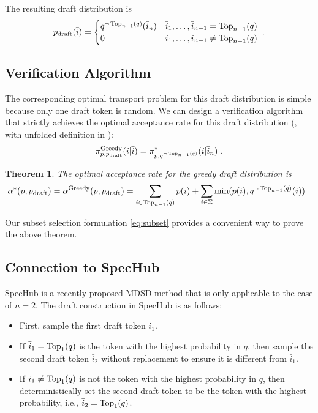 \documentclass{article}
\makeatletter
\newcommand{\crvspace}{\@ifstar\crvspacestar\crvspacenostar}
\newcommand{\crvspacenostar}[1]{}
\newcommand{\crvspacestar}[1]{}
\newtheorem{theorem}{Theorem}
\makeatother
\begin{document}
The resulting draft distribution is
\begin{equation}
p_{\operatorname{draft}}(\bar{i})=\begin{cases}q^{\neg \operatorname{Top}_{n-1}(q)}(\bar{i}_n)&\bar{i}_1,\dots,\bar{i}_{n-1}=\operatorname{Top}_{n-1}(q)\\0&\bar{i}_1,\dots,\bar{i}_{n-1}\neq\operatorname{Top}_{n-1}(q)\end{cases}
~.
\end{equation}

\subsection{Verification Algorithm}
The corresponding optimal transport problem for this draft distribution is simple because only one draft token is random. We can design a verification algorithm that strictly achieves the optimal acceptance rate for this draft distribution (, with unfolded definition in ):
\begin{equation}
\pi^{\operatorname{Greedy}}_{p,p_{\operatorname{draft}}}(i|\bar{i})=\pi^\ast_{p,q^{\neg \operatorname{Top}_{n-1}(q)}}(i|\bar{i}_n)
~.
\end{equation}


\begin{theorem}\label{th:greedy_optimal}
The optimal acceptance rate for the greedy draft distribution is
\begin{equation}
\alpha^\ast(p,p_{\operatorname{draft}})=\alpha^{\operatorname{Greedy}}(p,p_{\operatorname{draft}})=
\sum_{i\in\operatorname{Top}_{n-1}(q)}p(i)
+\sum_{i\in\Sigma}\min(p(i),q^{\neg \operatorname{Top}_{n-1}(q)}(i))
~.
\end{equation}
\end{theorem}
\par\crvspace{-5pt}
Our subset selection formulation \eqref{eq:subset} provides a convenient way to prove the above theorem.
\subsection{Connection to SpecHub}\label{se:connection_to_spechub}
SpecHub \citep{anonymous2024spechub} is a recently proposed MDSD method that is only applicable to the case of $n=2$. The draft construction in SpecHub is as follows:
\begin{itemize}[leftmargin=*,noitemsep=0mm,topsep=-2pt]
\item First, sample the first draft token $\bar{i}_1$.
\item If $\bar{i}_1=\operatorname{Top}_1(q)$ is the token with the highest probability in $q$, then sample the second draft token $\bar{i}_2$ without replacement to ensure it is different from $\bar{i}_1$.
\item If $\bar{i}_1\neq\operatorname{Top}_1(q)$ is not the token with the highest probability in $q$, then deterministically set the second draft token to be the token with the highest probability, i.e., $\bar{i}_2=\operatorname{Top}_1(q)$.
\end{itemize}
\end{document}
